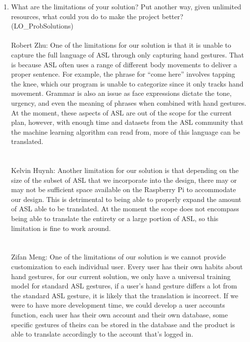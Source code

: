 \documentclass[12pt, titlepage]{article}
\begin{document}
\begin{enumerate}
  \item What are the limitations of your solution?  Put another way, given
  unlimited resources, what could you do to make the project better? (LO\_ProbSolutions)
  ~\\
  \\
  Robert Zhu: One of the limitations for our solution is that it is unable to capture the full language of ASL through only capturing hand gestures. 
  That is because ASL often uses a range of different body movements to deliver a proper sentence. For example, the phrase for “come here” involves 
  tapping the knee, which our program is unable to categorize since it only tracks hand movement. Grammar is also an issue as face expressions dictate 
  the tone, urgency, and even the meaning of phrases when combined with hand gestures. At the moment, these aspects of ASL are out of the scope for the 
  current plan, however, with enough time and datasets from the ASL community that the machine learning algorithm can read from, more of this language 
  can be translated.
  \\
  ~\\
  \\
  Kelvin Huynh: Another limitation for our solution is that depending on the size of the subset of ASL that we incorporate into the design, there may or 
  may not be sufficient space available on the Raspberry Pi to accommodate our design. This is detrimental to being able to properly expand the amount of 
  ASL able to be translated. At the moment the scope does not encompass being able to translate the entirety or a large portion of ASL, so this limitation 
  is fine to work around.
  \\
  ~\\
  \\
  Zifan Meng: One of the limitations of our solution is we cannot provide customization to each individual user. Every user has their own habits about
  hand gestures, for our current solution, we only have a universal training model for standard ASL gestures, if a user’s hand gesture differs a lot 
  from the standard ASL gesture, it is likely that the translation is incorrect. If we were to have more development time, we could develop a user accounts
  function, each user has their own account and their own database, some specific gestures of theirs can be stored in the database and the product is 
  able to translate accordingly to the account that’s logged in.
  \\

\end{enumerate}
\end{document}
